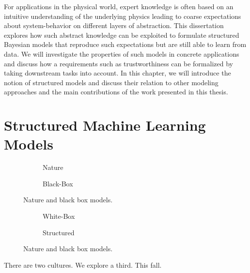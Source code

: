 For applications in the physical world, expert knowledge is often based on an intuitive understanding of the underlying physics leading to coarse expectations about system-behavior on different layers of abstraction.
This dissertation explores how such abstract knowledge can be exploited to formulate structured Bayesian models that reproduce such expectations but are still able to learn from data.
We will investigate the properties of such models in concrete applications and discuss how a requirements such as trustworthiness can be formalized by taking downstream tasks into account.
In this chapter, we will introduce the notion of structured models and discuss their relation to other modeling approaches and the main contributions of the work presented in this thesis.


\section{Structured Machine Learning Models}
\begin{figure}[t]
    \begin{subfigure}[b]{\halffigurewidth}
        \centering
        \caption{
            \label{fig:introduction:models:nature}
            Nature
        }
    \end{subfigure}
    \hfill
    \begin{subfigure}[b]{\halffigurewidth}
        \centering
        \caption{
            \label{fig:introduction:models:black_box}
            Black-Box
        }
    \end{subfigure}
    \caption{
        \label{fig:introduction:models:one}
        Nature and black box models.
    }
\end{figure}
\begin{figure}[t]
    \begin{subfigure}[b]{\halffigurewidth}
        \centering
        \caption{
            \label{fig:introduction:models:white_box}
            White-Box
        }
    \end{subfigure}
    \hfill
    \begin{subfigure}[b]{\halffigurewidth}
        \centering
        \caption{
            \label{fig:introduction:models:structured}
            Structured
        }
    \end{subfigure}
    \caption{
        \label{fig:introduction:models:two}
        Nature and black box models.
    }
\end{figure}
There are two cultures.
We explore a third.
This fall.


